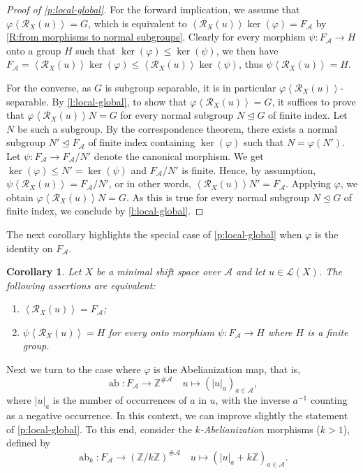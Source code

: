 \documentclass{amsart}
\newcommand*{\zz}{\mathbb{Z}}
\newcommand*{\Z}{\mathbb{Z}}
\newcommand*{\ret}{\mathcal{R}}
\newcommand*{\lang}{\mathcal{L}}
\newcommand*{\cA}{\mathcal{A}}
\newcommand*{\from}{\colon}
\newcommand*{\ab}{\operatorname{ab}}
\newcommand*{\card}{\#}
\newcommand*{\gen}[1]{\left\langle #1\right\rangle}
\theoremstyle{plain}
\newtheorem{corollary}[theorem]{Corollary}
\theoremstyle{definition}
\theoremstyle{remark}
\begin{document}
\begin{proof}[Proof of \cref{p:local-global}]
    For the forward implication, we assume that $\varphi\gen{\ret_X(u)} = G$, which is equivalent to $\gen{\ret_X(u)}\ker(\varphi) = F_\cA$ by \cref{R:from morphisms to normal subgroups}. Clearly for every morphism $\psi\from F_\cA\to H$ onto a group $H$ such that $\ker(\varphi) \leq \ker(\psi)$, we then have $F_\cA = \gen{\ret_X(u)}\ker(\varphi) \leq \gen{\ret_X(u)}\ker(\psi)$, thus $\psi\gen{\ret_X(u)} = H$.

    For the converse, as $G$ is subgroup separable, it is in particular $\varphi\gen{\ret_X(u)}$-separable.
    By \cref{l:local-global}, to show that $\varphi\gen{\ret_X(u)} = G$, it suffices to prove that $\varphi\gen{\ret_X(u)}N=G$ for every normal subgroup $N\trianglelefteq G$ of finite index. Let $N$ be such a subgroup.
    By the correspondence theorem, there exists a normal subgroup $N'\trianglelefteq F_\cA$ of finite index containing $\ker(\varphi)$ such that $N = \varphi(N')$.
    Let $\psi\from F_\cA\to F_\cA/N'$ denote the canonical morphism. We get $\ker(\varphi) \leq N' = \ker(\psi)$ and $F_\cA/N'$ is finite. Hence, by assumption, $\psi\gen{\ret_X(u)} = F_\cA/N'$, or in other words, $\gen{\ret_X(u)}N' = F_\cA$. Applying $\varphi$, we obtain $\varphi\gen{\ret_X(u)}N=G$. As this is true for every normal subgroup $N\trianglelefteq G$ of finite index, we conclude by \cref{l:local-global}.
\end{proof}

The next corollary highlights the special case of \cref{p:local-global} when $\varphi$ is the identity on $F_\cA$.
\begin{corollary}
    Let $X$ be a minimal shift space over $\cA$ and let $u\in\lang(X)$. The following assertions are equivalent:
    \begin{enumerate}
        \item $\gen{\ret_X(u)} = F_\cA$;
        \item $\psi\gen{\ret_X(u)} = H$ for every onto morphism $\psi\from F_\cA\to H$ where $H$ is a finite group.
    \end{enumerate}
\end{corollary}

Next we turn to the case where $\varphi$ is the Abelianization map, that is,
\begin{equation*}
        \ab\from F_\cA\to\zz^{\card\cA} \quad u \mapsto (|u|_a)_{a \in \cA},
\end{equation*}
where $|u|_a$ is the number of occurrences of $a$ in $u$, with the inverse $a^{-1}$ counting as a negative occurrence. In this context, we can improve slightly the statement of \cref{p:local-global}. To this end, consider the \emph{$k$-Abelianization} morphisms ($k>1$), defined by
\begin{equation*}
    \ab_k\from F_\cA\to(\zz/k\zz)^{\card\cA} \quad u \mapsto (|u|_a + k\Z)_{a \in \cA}.
\end{equation*}
\end{document}
